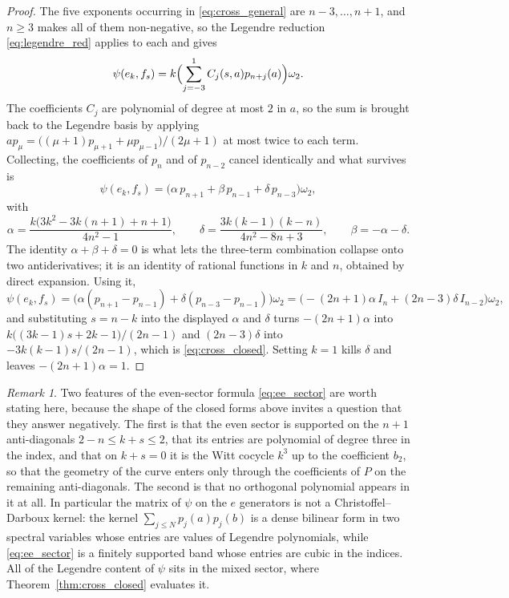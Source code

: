 \documentclass[11pt]{amsart}
\theoremstyle{definition}
\theoremstyle{remark}
\newtheorem{remark}[theorem]{Remark}
\begin{document}
\begin{proof}
The five exponents occurring in \eqref{eq:cross_general} are $n-3,\dots,n+1$,
and $n\geq3$ makes all of them non-negative, so the Legendre reduction
\eqref{eq:legendre_red} applies to each and gives
\[
  \psi(e_k,f_s)=k\Bigl(\sum_{j=-3}^{1}C_j(s,a)p_{n+j}(a)\Bigr)\omega_2 .
\]
The coefficients $C_j$ are polynomial of degree at most $2$ in $a$, so the sum
is brought back to the Legendre basis by applying
$ap_\mu=\bigl((\mu+1)p_{\mu+1}+\mu p_{\mu-1}\bigr)/(2\mu+1)$ at most twice to
each term. Collecting, the coefficients of $p_n$ and of $p_{n-2}$ cancel
identically and what survives is
\[
  \psi(e_k,f_s)=\bigl(\alpha\,p_{n+1}+\beta\,p_{n-1}+\delta\,p_{n-3}\bigr)\omega_2 ,
\]
with
\[
  \alpha=\frac{k\bigl(3k^2-3k(n+1)+n+1\bigr)}{4n^2-1},\qquad
  \delta=\frac{3k(k-1)(k-n)}{4n^2-8n+3},\qquad
  \beta=-\alpha-\delta .
\]
The identity $\alpha+\beta+\delta=0$ is what lets the three-term combination
collapse onto two antiderivatives; it is an identity of rational functions in
$k$ and $n$, obtained by direct expansion. Using it,
\[
  \psi(e_k,f_s)
   =\bigl(\alpha(p_{n+1}-p_{n-1})+\delta(p_{n-3}-p_{n-1})\bigr)\omega_2
   =\bigl(-(2n+1)\alpha\,I_n+(2n-3)\delta\,I_{n-2}\bigr)\omega_2 ,
\]
and substituting $s=n-k$ into the displayed $\alpha$ and $\delta$ turns
$-(2n+1)\alpha$ into $k\bigl((3k-1)s+2k-1\bigr)/(2n-1)$ and $(2n-3)\delta$ into
$-3k(k-1)s/(2n-1)$, which is \eqref{eq:cross_closed}. Setting $k=1$ kills
$\delta$ and leaves $-(2n+1)\alpha=1$.
\end{proof}




\begin{remark}\label{rem:no_christoffel_darboux}
Two features of the even-sector formula \eqref{eq:ee_sector} are worth stating
here, because the shape of the closed forms above invites a question that they
answer negatively. The
first is that the even sector is supported on the $n+1$ anti-diagonals
$2-n\leq k+s\leq2$, that its entries are polynomial of degree three in the
index, and that on $k+s=0$ it is the Witt cocycle $k^3$ up to the coefficient
$b_2$, so that the geometry of
the curve enters only through the coefficients of $P$ on the remaining
anti-diagonals. The second is that no orthogonal polynomial appears in it at
all. In particular the matrix of $\psi$ on the $e$ generators is not a
Christoffel--Darboux kernel: the kernel $\sum_{j\leq N}p_j(a)p_j(b)$ is a dense
bilinear form in two spectral variables whose entries are values of Legendre
polynomials, while \eqref{eq:ee_sector} is a finitely supported band whose
entries are cubic in the indices. All of the Legendre content of $\psi$ sits in
the mixed sector, where Theorem~\ref{thm:cross_closed} evaluates it.
\end{remark}
\end{document}

